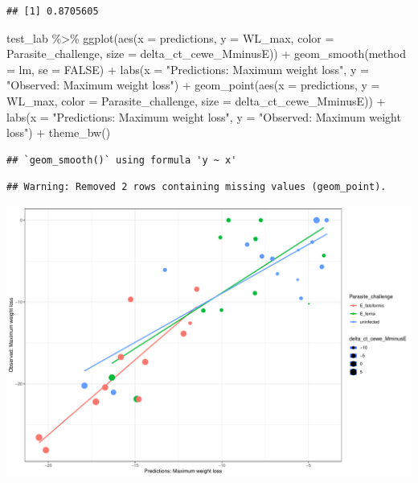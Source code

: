 \documentclass[
]{article}
\newenvironment{Shaded}{\begin{snugshade}}{\end{snugshade}}
\newcommand{\AttributeTok}[1]{\textcolor[rgb]{0.77,0.63,0.00}{#1}}
\newcommand{\ConstantTok}[1]{\textcolor[rgb]{0.00,0.00,0.00}{#1}}
\newcommand{\FunctionTok}[1]{\textcolor[rgb]{0.00,0.00,0.00}{#1}}
\newcommand{\NormalTok}[1]{#1}
\newcommand{\SpecialCharTok}[1]{\textcolor[rgb]{0.00,0.00,0.00}{#1}}
\newcommand{\StringTok}[1]{\textcolor[rgb]{0.31,0.60,0.02}{#1}}
\begin{document}
\begin{verbatim}
## [1] 0.8705605
\end{verbatim}

\begin{Shaded}
\begin{Highlighting}[]
\NormalTok{test\_lab   }\SpecialCharTok{\%\textgreater{}\%}
  \FunctionTok{ggplot}\NormalTok{(}\FunctionTok{aes}\NormalTok{(}\AttributeTok{x =}\NormalTok{ predictions, }\AttributeTok{y =}\NormalTok{ WL\_max, }\AttributeTok{color =}\NormalTok{ Parasite\_challenge, }
                 \AttributeTok{size =}\NormalTok{ delta\_ct\_cewe\_MminusE)) }\SpecialCharTok{+}
  \FunctionTok{geom\_smooth}\NormalTok{(}\AttributeTok{method =}\NormalTok{ lm, }\AttributeTok{se =} \ConstantTok{FALSE}\NormalTok{) }\SpecialCharTok{+}
  \FunctionTok{labs}\NormalTok{(}\AttributeTok{x =} \StringTok{"Predictions: Maximum weight loss"}\NormalTok{, }
       \AttributeTok{y =} \StringTok{"Observed: Maximum weight loss"}\NormalTok{) }\SpecialCharTok{+}
  \FunctionTok{geom\_point}\NormalTok{(}\FunctionTok{aes}\NormalTok{(}\AttributeTok{x =}\NormalTok{ predictions, }\AttributeTok{y =}\NormalTok{ WL\_max, }
                 \AttributeTok{color =}\NormalTok{ Parasite\_challenge, }\AttributeTok{size =}\NormalTok{ delta\_ct\_cewe\_MminusE)) }\SpecialCharTok{+}
  \FunctionTok{labs}\NormalTok{(}\AttributeTok{x =} \StringTok{"Predictions: Maximum weight loss"}\NormalTok{, }
       \AttributeTok{y =} \StringTok{"Observed: Maximum weight loss"}\NormalTok{) }\SpecialCharTok{+}
    \FunctionTok{theme\_bw}\NormalTok{()}
\end{Highlighting}
\end{Shaded}

\begin{verbatim}
## `geom_smooth()` using formula 'y ~ x'
\end{verbatim}

\begin{verbatim}
## Warning: Removed 2 rows containing missing values (geom_point).
\end{verbatim}

\includegraphics{8.Random_Forest_lab_gene_files/figure-latex/unnamed-chunk-9-1.pdf}
\end{document}
